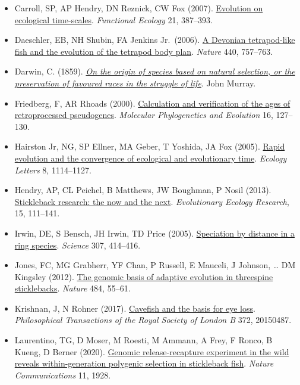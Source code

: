 \documentclass[
]{book}
\begin{document}
\begin{itemize}
\item
  Carroll, SP, AP Hendry, DN Reznick, CW Fox (2007). \href{https://besjournals.onlinelibrary.wiley.com/doi/full/10.1111/j.1365-2435.2007.01289.x}{Evolution on ecological time-scales}. \emph{Functional Ecology} 21, 387--393.
\item
  Daeschler, EB, NH Shubin, FA Jenkins Jr.~(2006). \href{https://www.nature.com/articles/nature04639}{A Devonian tetrapod-like fish and the evolution of the tetrapod body plan}. \emph{Nature} 440, 757--763.
\item
  Darwin, C. (1859). \href{https://www.biodiversitylibrary.org/item/122307\#page/7/mode/1up}{\emph{On the origin of species based on natural selection, or the preservation of favoured races in the struggle of life}}. John Murray.
\item
  Friedberg, F, AR Rhoads (2000). \href{https://pubmed.ncbi.nlm.nih.gov/10877945/}{Calculation and verification of the ages of retroprocessed pseudogenes}. \emph{Molecular Phylogenetics and Evolution} 16, 127--130.
\item
  Hairston Jr, NG, SP Ellner, MA Geber, T Yoshida, JA Fox (2005). \href{https://onlinelibrary.wiley.com/doi/full/10.1111/j.1461-0248.2005.00812.x}{Rapid evolution and the convergence of ecological and evolutionary time}. \emph{Ecology Letters} 8, 1114--1127.
\item
  Hendry, AP, CL Peichel, B Matthews, JW Boughman, P Nosil (2013). \href{http://www.evolutionary-ecology.com/open/ccar2833.pdf}{Stickleback research: the now and the next}. \emph{Evolutionary Ecology Research}, 15, 111--141.
\item
  Irwin, DE, S Bensch, JH Irwin, TD Price (2005). \href{https://science.sciencemag.org/content/307/5708/414}{Speciation by distance in a ring species}. \emph{Science} 307, 414--416.
\item
  Jones, FC, MG Grabherr, YF Chan, P Russell, E Mauceli, J Johnson, \ldots{} DM Kingsley (2012). \href{https://www.nature.com/articles/nature10944}{The genomic basis of adaptive evolution in threespine sticklebacks}. \emph{Nature} 484, 55--61.
\item
  Krishnan, J, N Rohner (2017). \href{https://royalsocietypublishing.org/doi/10.1098/rstb.2015.0487}{Cavefish and the basis for eye loss}. \emph{Philosophical Transactions of the Royal Society of London B} 372, 20150487.
\item
  Laurentino, TG, D Moser, M Roesti, M Ammann, A Frey, F Ronco, B Kueng, D Berner (2020). \href{https://www.nature.com/articles/s41467-020-15657-3}{Genomic release-recapture experiment in the wild reveals within-generation polygenic selection in stickleback fish}. \emph{Nature Communications} 11, 1928.

\end{itemize}
\end{document}
